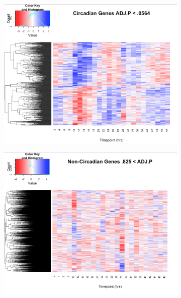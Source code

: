 \documentclass[prl,amsmath,amssymb,floatfix,superscriptaddress,notitlepage,twocolumn]{revtex4}
\begin{document}
\begin{figure}[t]
\vfill
\begin{subfigure}[t]{0.3\textwidth}\hfill
    \includegraphics[width=\textwidth]{Circadian.png}
    \label{fig:Circadian}
\end{subfigure}
\begin{subfigure}[t]{0.3\textwidth}
    \includegraphics[width=\textwidth]{Non-Circadian.png}
    \label{fig:Non-Circadian}
\end{subfigure}
\\ 
\begin{subfigure}[t]{0.3\textwidth}\hfill

\end{subfigure}
\end{figure}
\end{document}

